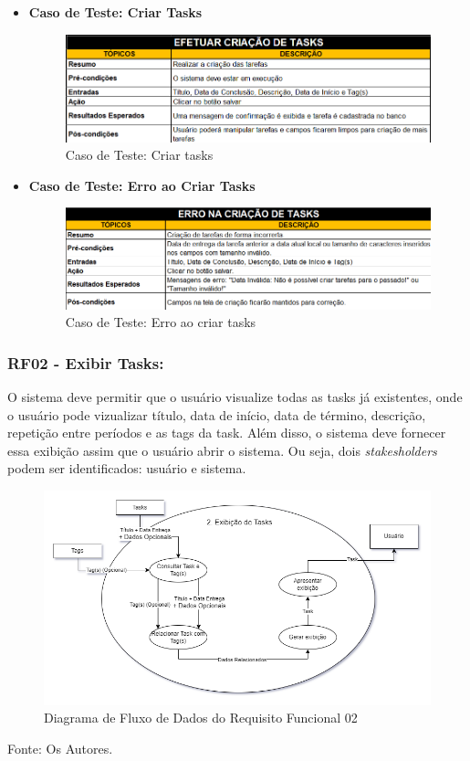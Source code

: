 \documentclass[a4paper,12pt]{article}
\begin{document}
\pagebreak
\begin{itemize}
	\item\textbf{Caso de Teste: Criar Tasks}
	\begin{figure}[H]
		\centering
		\includegraphics[scale=0.75]{UnitTest/trueCase/createTask.png}
		\caption{Caso de Teste: Criar tasks}
	\end{figure}
	\item\textbf{Caso de Teste: Erro ao Criar Tasks}
	\begin{figure}[H]
		\centering
		\includegraphics[scale=0.75]{UnitTest/falseCase/createTask.png}
		\caption{Caso de Teste: Erro ao criar tasks}
	\end{figure}
\end{itemize}

\pagebreak
\subsubsection{RF02 - Exibir Tasks:}
O sistema deve permitir que o usuário visualize todas as tasks já existentes, onde o usuário pode vizualizar 
título, data de início, data de término, descrição, repetição entre períodos e as tags da task. Além disso, o 
sistema deve fornecer essa exibição assim que o usuário abrir o sistema. Ou seja, dois \textit{stakesholders} 
podem ser identificados: usuário e sistema.
\begin{figure}[H]
	\centering
	\includegraphics[scale=0.45]{DFDs/RF02.drawio.png}
	\caption{Diagrama de Fluxo de Dados do Requisito Funcional 02}
\end{figure}
\noindent Fonte: Os Autores.
\end{document}

